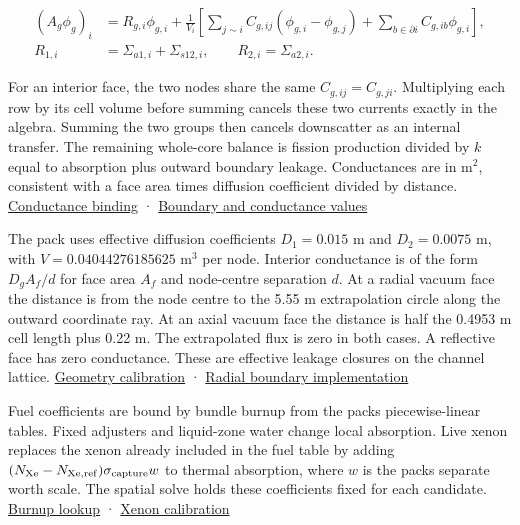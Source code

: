 \documentclass[11pt,letterpaper]{article}
\begin{document}
\begin{equation}
\label{eq:finite-volume}
\begin{aligned}
(A_g\phi_g)_i &= R_{g,i}\phi_{g,i}+\frac{1}{V_i}\left[
\sum_{j\sim i} C_{g,ij}(\phi_{g,i}-\phi_{g,j})
+\sum_{b\in\partial i} C_{g,ib}\phi_{g,i}
\right],\\
R_{1,i} &= \Sigma_{a1,i}+\Sigma_{s12,i},
\qquad R_{2,i}=\Sigma_{a2,i}.
\end{aligned}
\end{equation}

For an interior face, the two nodes share the same \(C_{g,ij}=C_{g,ji}\). Multiplying
each row by its cell volume before summing cancels these two currents exactly in the
algebra. Summing the two groups then cancels downscatter as an internal transfer. The
remaining whole-core balance is fission production divided by \(k\) equal to absorption
plus outward boundary leakage. Conductances are in m\(^2\), consistent with a face area
times diffusion coefficient divided by distance.
\href{https://github.com/hkkho/CRS/blob/4341ae8881f5827988c3d8b1859aa9e8f13cd8a6/src/ReactorSim.Core/Domain/SpatialOperatorContracts.cs\#L1011}{Conductance
binding} ·
\href{https://github.com/hkkho/CRS/blob/4341ae8881f5827988c3d8b1859aa9e8f13cd8a6/docs/physics/active-two-group-solver.md}{Boundary
and conductance values}

The pack uses effective diffusion coefficients \(D_1=0.015\) m and \(D_2=0.0075\) m,
with \(V=0.04044276185625\) m\(^3\) per node. Interior conductance is of the form
\(D_g A_f/d\) for face area \(A_f\) and node-centre separation \(d\). At a radial vacuum
face the distance is from the node centre to the 5.55 m extrapolation circle along the
outward coordinate ray. At an axial vacuum face the distance is half the 0.4953 m cell
length plus 0.22 m. The extrapolated flux is zero in both cases. A reflective face has
zero conductance. These are effective leakage closures on the channel lattice.
\href{https://github.com/hkkho/CRS/blob/4341ae8881f5827988c3d8b1859aa9e8f13cd8a6/data/calibration/diffusion-v10/README.md}{Geometry
calibration} ·
\href{https://github.com/hkkho/CRS/blob/4341ae8881f5827988c3d8b1859aa9e8f13cd8a6/src/ReactorSim.Core/Domain/CircularRadialBoundary.cs}{Radial
boundary implementation}

Fuel coefficients are bound by bundle burnup from the pack\textquotesingle s
piecewise-linear tables. Fixed adjusters and liquid-zone water change local absorption.
Live xenon replaces the xenon already included in the fuel table by adding
\((N_{\rm Xe}-N_{\rm Xe,ref})\sigma_{\rm capture}w\) to thermal absorption, where \(w\)
is the pack\textquotesingle s separate worth scale. The spatial solve holds these
coefficients fixed for each candidate.
\href{https://github.com/hkkho/CRS/blob/4341ae8881f5827988c3d8b1859aa9e8f13cd8a6/src/ReactorSim.Core/Domain/BurnupCoefficientContracts.cs}{Burnup
lookup} ·
\href{https://github.com/hkkho/CRS/blob/4341ae8881f5827988c3d8b1859aa9e8f13cd8a6/docs/physics/xenon-calibration.md}{Xenon
calibration}
\end{document}
